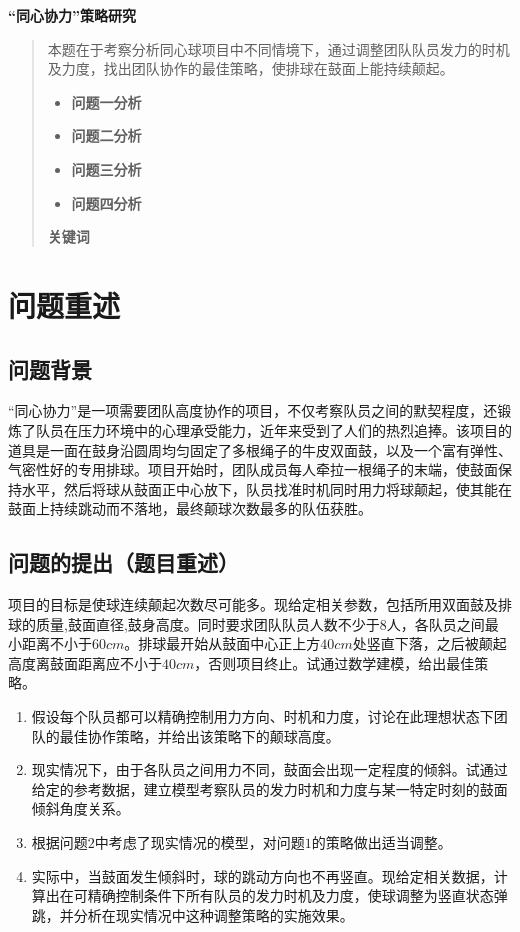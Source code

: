 \documentclass{cumcm}
\begin{document}
\begin{minipage}{0.9\textwidth}
\centering\LARGE\textbf{“同心协力”策略研究}

\end{minipage}
\begin{abstract}
本题在于考察分析同心球项目中不同情境下，通过调整团队队员发力的时机及力度，找出团队协作的最佳策略，使排球在鼓面上能持续颠起。\par
\begin{itemize}
\item \textbf{问题一分析}\quad\\
\item \textbf{问题二分析}\quad\\
\item \textbf{问题三分析}\quad\\
\item \textbf{问题四分析}\quad\\
\end{itemize}
\textbf{关键词} \quad  \quad  \quad 
\end{abstract}

\newpage
\section{问题重述}
\subsection{问题背景}
“同心协力”是一项需要团队高度协作的项目，不仅考察队员之间的默契程度，还锻炼了队员在压力环境中的心理承受能力，近年来受到了人们的热烈追捧。该项目的道具是一面在鼓身沿圆周均匀固定了多根绳子的牛皮双面鼓，以及一个富有弹性、气密性好的专用排球。项目开始时，团队成员每人牵拉一根绳子的末端，使鼓面保持水平，然后将球从鼓面正中心放下，队员找准时机同时用力将球颠起，使其能在鼓面上持续跳动而不落地，最终颠球次数最多的队伍获胜。
\subsection{问题的提出（题目重述）}
项目的目标是使球连续颠起次数尽可能多。现给定相关参数，包括所用双面鼓及排球的质量,鼓面直径,鼓身高度。同时要求团队队员人数不少于$8$人，各队员之间最小距离不小于$60cm$。排球最开始从鼓面中心正上方$40cm$处竖直下落，之后被颠起高度离鼓面距离应不小于$40cm$，否则项目终止。试通过数学建模，给出最佳策略。
\begin{enumerate}[(1)]
\item 假设每个队员都可以精确控制用力方向、时机和力度，讨论在此理想状态下团队的最佳协作策略，并给出该策略下的颠球高度。
\item 现实情况下，由于各队员之间用力不同，鼓面会出现一定程度的倾斜。试通过给定的参考数据，建立模型考察队员的发力时机和力度与某一特定时刻的鼓面倾斜角度关系。
\item 根据问题$2$中考虑了现实情况的模型，对问题$1$的策略做出适当调整。
\item 实际中，当鼓面发生倾斜时，球的跳动方向也不再竖直。现给定相关数据，计算出在可精确控制条件下所有队员的发力时机及力度，使球调整为竖直状态弹跳，并分析在现实情况中这种调整策略的实施效果。
\end{enumerate}
\end{document}
